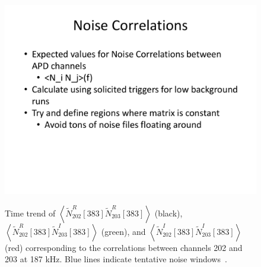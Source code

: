 \begin{figure}
\begin{center}
\includegraphics[keepaspectratio=true,page=5,width=\textwidth,clip=true,trim=0.2in 0.5in 0.5in 0.3in]{APD_Denoising_noise_correlations.pdf}
\end{center}
\renewcommand{\baselinestretch}{1}
\small\normalsize
\begin{quote}
\caption{Time trend of $\left<\widetilde{N}^R_{202}[383]\widetilde{N}^R_{203}[383]\right>$ (black), $\left<\widetilde{N}^R_{202}[383]\widetilde{N}^I_{203}[383]\right>$ (green), and $\left<\widetilde{N}^I_{202}[383]\widetilde{N}^I_{203}[383]\right>$ (red) corresponding to the correlations between channels 202 and 203 at 187 kHz.  Blue lines indicate tentative noise windows~\cite{MikeCoherentAPDNoise}.}
\label{fig:MikeNoise_202_203}
\end{quote}
\end{figure}
\renewcommand{\baselinestretch}{2}
\small\normalsize

